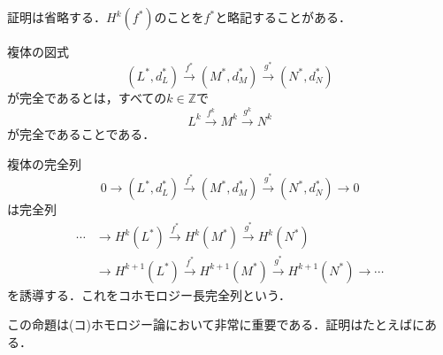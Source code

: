 \documentclass[uplatex]{jsarticle}
\begin{document}
証明は省略する．$H^k(f^*)$のことを$f^*$と略記することがある．
\begin{definition}
複体の図式
\[ (L^*,d^*_L)\stackrel{f^*}{\to}(M^*,d^*_M)\stackrel{g^*}{\to}(N^*,d^*_N) \]
が完全であるとは，すべての$k\in\mathbb{Z}$で
\[ L^k\stackrel{f^k}{\to}M^k\stackrel{g^k}{\to}N^k \]
が完全であることである．
\end{definition}
\begin{proposition}
複体の完全列
\[ 0\to (L^*,d^*_L)\stackrel{f^*}{\to}(M^*,d^*_M)\stackrel{g^*}{\to}(N^*,d^*_N)\to 0 \]
は完全列
\begin{align*}
\cdots&\to H^k(L^*)\stackrel{f^*}{\to}H^k(M^*)\stackrel{g^*}{\to}H^k(N^*) \\
&\to H^{k+1}(L^*)\stackrel{f^*}{\to}H^{k+1}(M^*)\stackrel{g^*}{\to}H^{k+1}(N^*)\to\cdots
\end{align*}
を誘導する．これをコホモロジー長完全列という．
\end{proposition}
この命題は(コ)ホモロジー論において非常に重要である．証明はたとえば\cite{枡田}にある．
\end{document}
